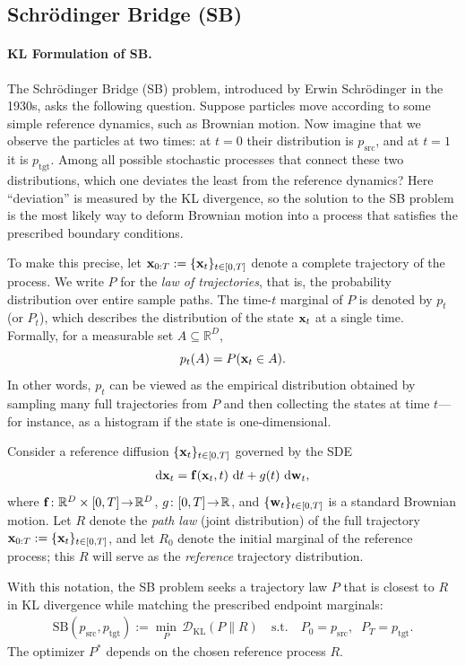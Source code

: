 \subsection{Schrödinger Bridge (SB)}\label{subsec:sb}


\paragraph{KL Formulation of SB.}
The Schrödinger Bridge (SB) problem, introduced by Erwin Schrödinger in the 1930s,
asks the following question. Suppose particles move according to some simple
reference dynamics, such as Brownian motion. Now imagine that we observe the
particles at two times: at $t=0$ their distribution is $p_{\mathrm{src}}$, and
at $t=1$ it is $p_{\mathrm{tgt}}$. Among all possible stochastic processes
that connect these two distributions, which one deviates the least from the
reference dynamics? Here ``deviation'' is measured by the KL divergence, so the
solution to the SB problem is the most likely way to deform Brownian motion
into a process that satisfies the prescribed boundary conditions.

To make this precise, let ${\mathbf{x}}_{0:T}:=\{{\mathbf{x}}_t\}_{t\in[0,T]}$ denote a complete
trajectory of the process. We write $P$ for the \emph{law of trajectories},
that is, the probability distribution over entire sample paths. The time-$t$
marginal of $P$ is denoted by $p_t$ (or $P_t$), which describes the
distribution of the state ${\mathbf{x}}_t$ at a single time. Formally, for a measurable
set $A\subseteq\mathbb R^D$,
\[
p_t(A) = P({\mathbf{x}}_t \in A).
\]
In other words, $p_t$ can be viewed as the empirical distribution obtained by
sampling many full trajectories from $P$ and then collecting the states at
time $t$—for instance, as a histogram if the state is one-dimensional.


Consider a reference diffusion $\{{\mathbf{x}}_t\}_{t\in[0,T]}$ governed by the SDE
\begin{align}\label{eq:general-sb-sde}
    \mathop{}\!\mathrm{d} {\mathbf{x}}_t  =  {\mathbf{f}}({\mathbf{x}}_t,t)\,\mathop{}\!\mathrm{d} t  +  g(t)\,\mathop{}\!\mathrm{d} {\mathbf{w}}_t,
\end{align}
where ${\mathbf{f}}\colon \mathbb{R}^D\times[0,T]\!\to\!\mathbb{R}^D$, $g\colon[0,T]\!\to\!\mathbb{R}$, and
$\{{\mathbf{w}}_t\}_{t\in[0,T]}$ is a standard Brownian motion.  
Let $R$ denote the \emph{path law} (joint distribution) of the full trajectory
${\mathbf{x}}_{0:T}:=\{{\mathbf{x}}_t\}_{t\in[0,T]}$, and let $R_0$ denote the initial marginal of the reference process; this $R$ will serve as the \emph{reference}
trajectory distribution.

With this notation, the SB problem seeks a trajectory law $P$
that is closest to $R$ in KL divergence while matching the prescribed endpoint
marginals:
\begin{align}\label{eq:sb-epsilon-general}
    \mathrm{SB}(p_{\mathrm{src}}, p_{\mathrm{tgt}})
    := \min_{P}\, \mathcal{D}_{\mathrm{KL}}(P\|R)
    \quad \text{s.t.} \quad P_0 = p_{\mathrm{src}},\;\; P_T = p_{\mathrm{tgt}}.
\end{align}
The optimizer $P^*$ depends on the chosen reference process $R$.

